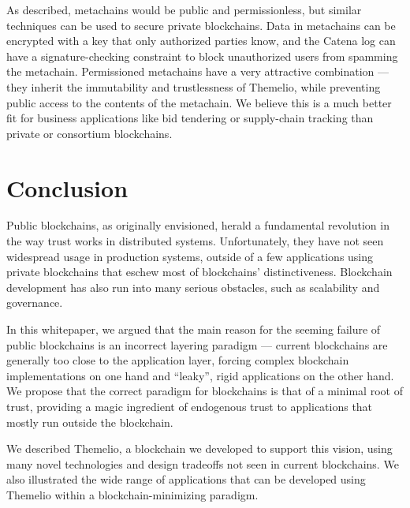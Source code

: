 \documentclass[headinclude,12pt]{scrbook}
\begin{document}
As described, metachains would be public and permissionless, but similar techniques can be used to secure private blockchains. Data in metachains can be encrypted with a key that only authorized parties know, and the Catena log can have a signature-checking constraint to block unauthorized users from spamming the metachain. Permissioned metachains have a very attractive combination --- they inherit the immutability and trustlessness of Themelio, while preventing public access to the contents of the metachain. We believe this is a much better fit for business applications like bid tendering or supply-chain tracking than private or consortium blockchains.

\chapter*{Conclusion}

Public blockchains, as originally envisioned, herald a fundamental revolution in the way trust works in distributed systems. Unfortunately, they have not seen widespread usage in production systems, outside of a few applications using private blockchains that eschew most of blockchains' distinctiveness. Blockchain development has also run into many serious obstacles, such as scalability and governance.

In this whitepaper, we argued that the main reason for the seeming failure of public blockchains is an incorrect layering paradigm --- current blockchains are generally too close to the application layer, forcing complex blockchain implementations on one hand and ``leaky'', rigid applications on the other hand. We propose that the correct paradigm for blockchains is that of a minimal root of trust, providing a magic ingredient of endogenous trust to applications that mostly run outside the blockchain.

We described Themelio, a blockchain we developed to support this vision, using many novel technologies and design tradeoffs not seen in current blockchains. We also illustrated the wide range of applications that can be developed using Themelio within a blockchain-minimizing paradigm.


\printbibliography
\end{document}
